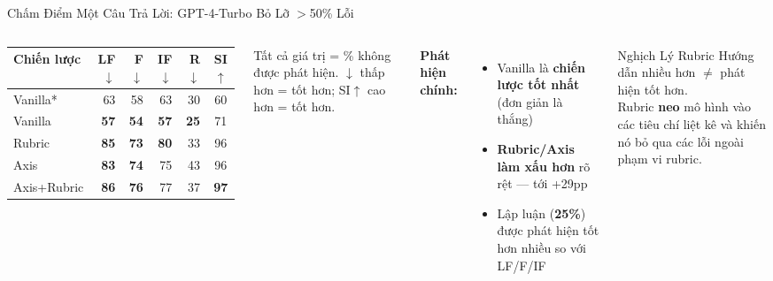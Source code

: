 \documentclass[aspectratio=169,10pt]{beamer}
\newcommand{\good}[1]{\textcolor{green!60!black}{\textbf{#1}}}
\newcommand{\bad}[1]{\textcolor{aclred}{\textbf{#1}}}
\begin{document}
\begin{frame}{Chấm Điểm Một Câu Trả Lời: GPT-4-Turbo Bỏ Lỡ $>$50\% Lỗi}
  \begin{columns}[T]
      \small
      \begin{tabular}{lrrrrc}
        \toprule
        \textbf{Chiến lược} & \textbf{LF}$\downarrow$ & \textbf{F}$\downarrow$ & \textbf{IF}$\downarrow$ & \textbf{R}$\downarrow$ & \textbf{SI}$\uparrow$ \\
        \midrule
        Vanilla*      & 63 & 58 & 63 & 30 & 60 \\
        \rowcolor{acllightblue}
        Vanilla       & \good{57} & \good{54} & \good{57} & \good{25} & 71 \\
        Rubric        & \bad{85} & \bad{73} & \bad{80} & 33 & 96 \\
        Axis          & \bad{83} & \bad{74} & 75 & 43 & 96 \\
        Axis+Rubric   & \bad{86} & \bad{76} & 77 & 37 & \good{97} \\
        \bottomrule
      \end{tabular}
      \vspace{0.3em}
      \small Tất cả giá trị = \% không được phát hiện. $\downarrow$ thấp hơn = tốt hơn; SI$\uparrow$ cao hơn = tốt hơn.

      \textbf{Phát hiện chính:}
      \begin{itemize}
        \item Vanilla là \good{chiến lược tốt nhất} (đơn giản là thắng)
        \item \bad{Rubric/Axis làm xấu hơn} rõ rệt — tới +29pp
        \item Lập luận (\good{25\%}) được phát hiện tốt hơn nhiều so với LF/F/IF
      \end{itemize}

      \vspace{0.5em}
      \begin{alertblock}{Nghịch Lý Rubric}
        Hướng dẫn nhiều hơn $\neq$ phát hiện tốt hơn.\\
        Rubric \textbf{neo} mô hình vào các tiêu chí liệt kê và khiến nó bỏ qua các lỗi ngoài phạm vi rubric.
      \end{alertblock}
  \end{columns}
\end{frame}
\end{document}
